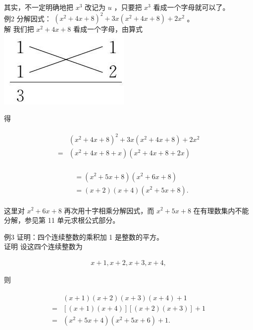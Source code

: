 \documentclass[10pt]{article}
\begin{document}
其实，不一定明确地把 $x^{3}$ 改记为 $u$ ，只要把 $x^{3}$ 看成一个字母就可以了。\\
例2 分解因式： $\left(x^{2}+4 x+8\right)^{2}+3 x\left(x^{2}+4 x+8\right)+2 x^{2}$ 。\\
解 我们把 $x^{2}+4 x+8$ 看成一个字母，由算式\\
\includegraphics[max width=\textwidth, center]{2024_10_30_bd799899fef40368a068g-047(1)}

得

\begin{align*}
\begin{aligned}
& \left(x^{2}+4 x+8\right)^{2}+3 x\left(x^{2}+4 x+8\right)+2 x^{2} \\
= & \left(x^{2}+4 x+8+x\right)\left(x^{2}+4 x+8+2 x\right)
\end{aligned}
\end{align*}

\begin{align*}
\begin{aligned}
& =\left(x^{2}+5 x+8\right)\left(x^{2}+6 x+8\right) \\
& =(x+2)(x+4)\left(x^{2}+5 x+8\right) .
\end{aligned}
\end{align*}

这里对 $x^{2}+6 x+8$ 再次用十字相乘分解因式，而 $x^{2}+5 x+8$ 在有理数集内不能分解，参见第 11 单元求根公式部分。

例3 证明：四个连续整数的乘积加 1 是整数的平方。\\
证明 设这四个连续整数为

\begin{align*}
x+1, x+2, x+3, x+4,
\end{align*}

则

\begin{align*}
\begin{aligned}
& (x+1)(x+2)(x+3)(x+4)+1 \\
= & {[(x+1)(x+4)][(x+2)(x+3)]+1 } \\
= & \left(x^{2}+5 x+4\right)\left(x^{2}+5 x+6\right)+1 .
\end{aligned}
\end{align*}
\end{document}
